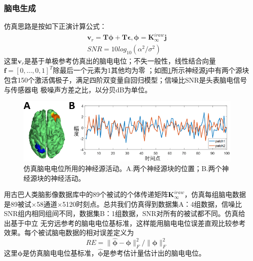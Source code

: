 \subsubsection{脑电生成}
仿真思路是按如下正演计算公式：
\begin{equation}\label{eq3.18}
\begin{aligned}
\mathbf{v}_r=\mathbf{T\phi}+\mathbf{T\epsilon},\mathbf{\phi}=\mathbf{K}_{\infty}^{iraw}\mathbf{j}\\
SNR=10log_{10}(\alpha^2/\sigma^2)
\end{aligned}
\end{equation}
这里$\mathbf{v}_r$是基于单极参考仿真出的脑电电位；不失一般性，线性结合向量$\mathbf{f}=[0,...,0,1]^T$除最后一个元素为1其他均为零
；如图\ref{3:3}所示神经源$\mathbf{j}$中有两个源块包含150个激活偶极子，满足四阶双变量自回归模型；信噪比SNR是头表脑电信号与传感器电
极噪声方差之比，以分贝dB为单位。
\begin{figure}[!h]
	\centering
	\includegraphics[width=15cm]{pic/Frontier/figure3.png}
	\caption{仿真脑电电位所用的神经源活动。A.两个神经源块的位置；B.两个神经源块的神经活动。}
	\label{3:3}
\end{figure}
用古巴人类脑影像数据库中的89个被试的个体传递矩阵$\mathbf{K}_{\infty}^{iraw}$，仿真每组脑电数据是89被试$\times$58通道$\times$5120时刻点。总共我们仿真得到数据集A：4组数据，信噪比SNR组内相同组间不同，数据集B：1组数据，SNR对所有的被试都不同。仿真给出基于中立
无穷远参考的脑电电位基标准，这样能用脑电电位误差直观比较参考效果。每个被试脑电数据的相对误差定义为
\begin{equation}\label{eq3.19}
RE=\lVert\hat{\mathbf{\phi}}-\mathbf{\phi}\rVert^2_F/{\lVert\mathbf{\phi}\rVert^2_F}
\end{equation}
这里$\mathbf{\phi}$是仿真脑电电位基标准，$\hat{\mathbf{\phi}}$是参考估计量估计出的脑电电位。

